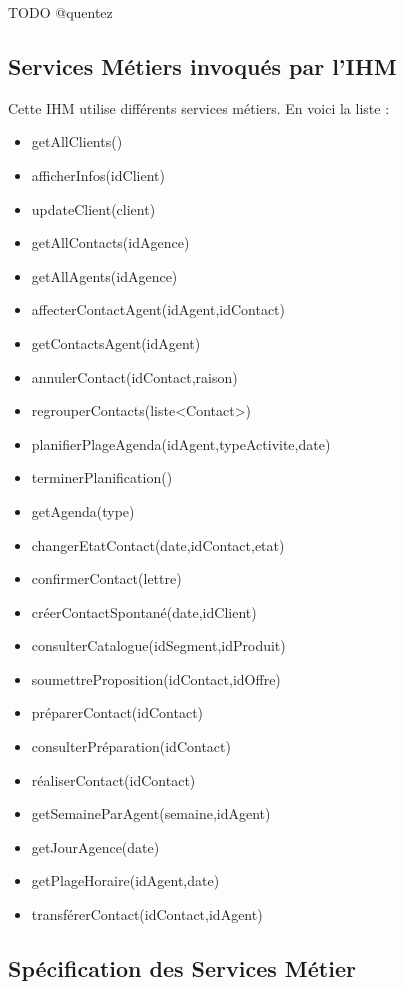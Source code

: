 TODO @quentez

\subsection{Services Métiers invoqués par l'IHM}

Cette IHM utilise différents services métiers. En voici la liste :

\begin{itemize}
\item getAllClients()
\item afficherInfos(idClient)
\item updateClient(client)
\item getAllContacts(idAgence)
\item getAllAgents(idAgence)
\item affecterContactAgent(idAgent,idContact)
\item getContactsAgent(idAgent)
\item annulerContact(idContact,raison)
\item regrouperContacts(liste<Contact>)
\item planifierPlageAgenda(idAgent,typeActivite,date)
\item terminerPlanification()
\item getAgenda(type)
\item changerEtatContact(date,idContact,etat)
\item confirmerContact(lettre)
\item créerContactSpontané(date,idClient)
\item consulterCatalogue(idSegment,idProduit)
\item soumettreProposition(idContact,idOffre)
\item préparerContact(idContact)
\item consulterPréparation(idContact)
\item réaliserContact(idContact)
\item getSemaineParAgent(semaine,idAgent)
\item getJourAgence(date)
\item getPlageHoraire(idAgent,date)
\item transférerContact(idContact,idAgent)
\end{itemize}

\subsection{Spécification des Services Métier}

